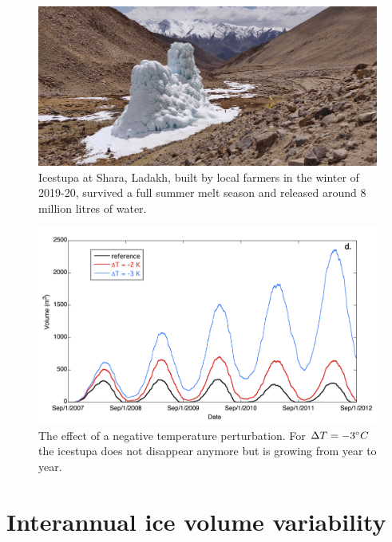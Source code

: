 \begin{figure}[htb]
	\centering
	\includegraphics[width=\textwidth]{figs/PIR_example.jpg}

	\caption{Icestupa at Shara, Ladakh, built by local farmers in the winter of 2019-20, survived a full summer melt season and released
		around 8 million litres of water.}

	\label{fig:PIR}
\end{figure}

\begin{figure}[htb]
	\centering
	\includegraphics[width=\textwidth]{figs/PIR_evolution.png}
	\caption{The effect of a negative temperature perturbation. For $\Delta T = -3 ^{\circ} C$ the icestupa does
		not disappear anymore but is growing from year to year.}
	\label{fig:PIR_evolution}
\end{figure}


\section{Interannual ice volume variability}
\label{sec:interannual}

